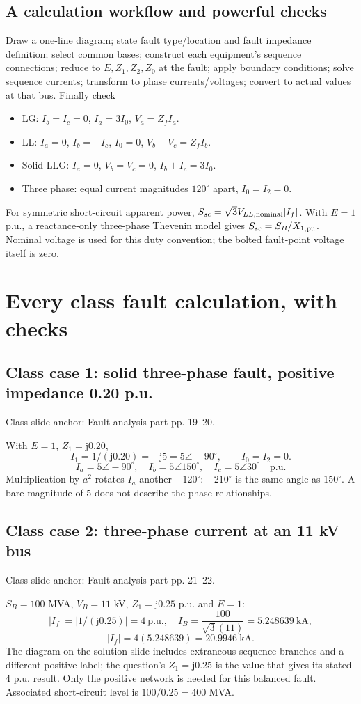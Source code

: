 \documentclass[11pt,a4paper]{article}
\newcommand{\slides}[1]{{\small\color{muted}\textsf{Class-slide anchor: #1.}}\par}
\newcommand{\chapterstart}[2]{\clearpage\section{#1}\label{#2}}
\newcommand{\ans}[1]{\boxed{#1}}
\newcommand{\jj}{\mathrm j}
\begin{document}
\subsection{A calculation workflow and powerful checks}
Draw a one-line diagram; state fault type/location and fault impedance definition; select common bases; construct each equipment's sequence connections; reduce to $E,Z_1,Z_2,Z_0$ at the fault; apply boundary conditions; solve sequence currents; transform to phase currents/voltages; convert to actual values at that bus. Finally check
\begin{itemize}
\item LG: $I_b=I_c=0$, $I_a=3I_0$, $V_a=Z_fI_a$.
\item LL: $I_a=0$, $I_b=-I_c$, $I_0=0$, $V_b-V_c=Z_fI_b$.
\item Solid LLG: $I_a=0$, $V_b=V_c=0$, $I_b+I_c=3I_0$.
\item Three phase: equal current magnitudes $120^\circ$ apart, $I_0=I_2=0$.
\end{itemize}
For symmetric short-circuit apparent power, $S_{sc}=\sqrt3V_{LL,\rm nominal}|I_f|$. With $E=1$ p.u., a reactance-only three-phase Thevenin model gives $S_{sc}=S_B/X_{1,\rm pu}$. Nominal voltage is used for this duty convention; the bolted fault-point voltage itself is zero.

\chapterstart{Every class fault calculation, with checks}{faultnumericals}
\subsection{Class case 1: solid three-phase fault, positive impedance 0.20 p.u.}
\slides{Fault-analysis part pp. 19--20}
With $E=1$, $Z_1=\jj0.20$,
\[
 I_1=1/(\jj0.20)=-\jj5=5\angle-90^\circ,\qquad I_0=I_2=0.
\]
\[
 \ans{I_a=5\angle-90^\circ},\quad
 \ans{I_b=5\angle150^\circ},\quad \ans{I_c=5\angle30^\circ}\quad\mathrm{p.u.}
\]
Multiplication by $a^2$ rotates $I_a$ another $-120^\circ$: $-210^\circ$ is the same angle as $150^\circ$. A bare magnitude of 5 does not describe the phase relationships.
\subsection{Class case 2: three-phase current at an 11 kV bus}
\slides{Fault-analysis part pp. 21--22}
$S_B=100$ MVA, $V_B=11$ kV, $Z_1=\jj0.25$ p.u. and $E=1$:
\[
 |I_f|=|1/(\jj0.25)|=4\ \mathrm{p.u.},\quad
 I_B=\frac{100}{\sqrt3(11)}=5.248639\ \mathrm{kA},
\]
\[
 \ans{|I_f|=4(5.248639)=20.9946\ \mathrm{kA}}.
\]
The diagram on the solution slide includes extraneous sequence branches and a different positive label; the question's $Z_1=\jj0.25$ is the value that gives its stated 4 p.u. result. Only the positive network is needed for this balanced fault. Associated short-circuit level is $100/0.25=400$ MVA.
\end{document}
